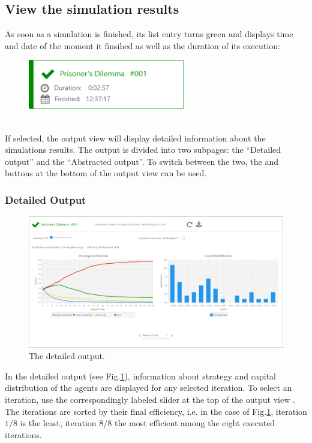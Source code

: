 \documentclass[parskip=full,11pt]{scrartcl}
\newcommand*\circled[1]{\tikz[baseline=(char.base)]{
            \node[shape=circle,draw,inner sep=2pt] (char) {#1};}}
\newlength\myheight
\newlength\mydepth
\newcommand*\inlinegraphics[1]{%
  \settototalheight\myheight{Xygp}%
  \settodepth\mydepth{Xygp}%
  \raisebox{-1.8\mydepth}{\texttt{[image: \#1]}}%
}
\begin{document}
\subsection{View the simulation results}
As soon as a simulation is finished, its list entry turns green and displays time and date of the moment it finsihed as well as the duration of its execution:
\begin{figure}[h]
	\centering
	\includegraphics[width=0.3\linewidth]{img_manual/finished_simulation_list_entry.png}
\end{figure}\\
If selected, the output view will display detailed information about the simulations results. The output is divided into two subpages: the \enquote{Detailed output} and the \enquote{Abstracted output}. To switch between the two, the  \inlinegraphics{img_manual/arrow_left_button.png} and  \inlinegraphics{img_manual/arrow_right_button.png} buttons at the bottom of the output view can be used.

\subsubsection{Detailed Output}
\begin{figure}
	\centering
	\includegraphics[width=\linewidth]{img_manual/detailed_output.png}
	\caption{The detailed output.}
	\label{fig:detailed_output}
\end{figure}
In the detailed output (see Fig.\ref{fig:detailed_output}), information about strategy and capital distribution of the agents are displayed for any selected iteration. To select an iteration, use the correspondingly labeled slider at the top of the output view \circled{1}. The iterations are sorted by their final efficiency, i.e. in the case of Fig.\ref{fig:detailed_output}, iteration \(1/8\) is the least, iteration \(8/8\) the most efficient among the eight executed iterations.
\end{document}
